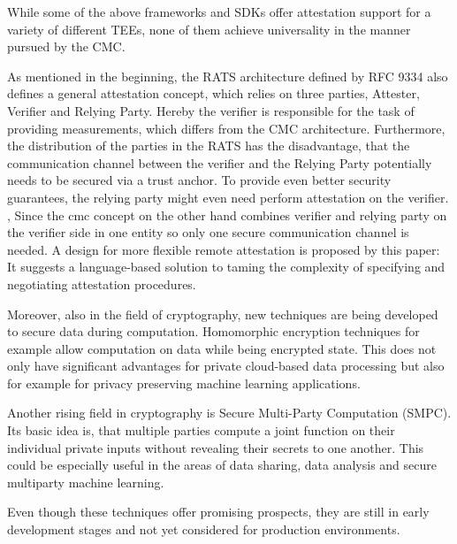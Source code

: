 While some of the above frameworks and SDKs offer attestation support for a variety of different TEEs, none of them achieve universality in the manner pursued by the CMC.

As mentioned in the beginning, the RATS architecture defined by RFC 9334 also defines a general attestation concept, which relies on three parties, Attester, Verifier and Relying Party.  
Hereby the verifier is responsible for the task of providing measurements, which differs from the CMC architecture. Furthermore, the distribution of the parties in the RATS has the disadvantage, that the communication channel between the verifier and the Relying Party potentially needs to be secured via a trust anchor. \cite{CMC_paper} 
To provide even better security guarantees, the relying party might even need perform attestation on the verifier. \cite{rfc9334}, 
Since the cmc concept on the other hand combines verifier and relying party on the verifier side in one entity so only one secure communication channel is needed.
A design for more flexible remote attestation is proposed by this paper: \cite{flexible_RA}
It suggests a language-based solution to taming the complexity of specifying and negotiating attestation procedures. 


Moreover, also in the field of cryptography, new techniques are being developed to secure data during computation. Homomorphic encryption techniques for example allow computation on data while being encrypted state. \cite{homorphic_encryption}
This does not only have significant advantages for private cloud-based data processing but also for example for privacy preserving machine learning applications. 

Another rising field in cryptography is Secure Multi-Party Computation (SMPC). Its basic idea is, that multiple parties compute a joint function on their individual private inputs without revealing their secrets to one another. \cite{smpc}
This could be especially useful in the areas of data sharing, data analysis and secure multiparty machine learning. 

Even though these techniques offer promising prospects, they are still in early development stages and not yet considered for production environments.


